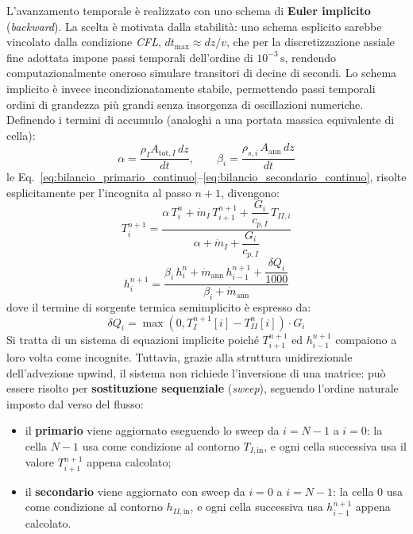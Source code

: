 \documentclass[12pt]{report}
\begin{document}
L'avanzamento temporale è realizzato con uno schema di \textbf{Euler implicito} (\emph{backward}). La scelta è motivata dalla stabilità: uno schema esplicito sarebbe vincolato dalla condizione \textit{CFL}, $dt_{\max}\approx dz/v$, che per la discretizzazione assiale fine adottata impone passi temporali dell'ordine di $10^{-3}\,\si{\second}$, rendendo computazionalmente oneroso simulare transitori di decine di secondi. Lo schema implicito è invece incondizionatamente stabile, permettendo passi temporali ordini di grandezza più grandi senza insorgenza di oscillazioni numeriche.\\
Definendo i termini di accumulo (analoghi a una portata massica equivalente di cella):
\begin{equation}
    \alpha = \frac{\rho_I A_{\text{tot},I}\, dz}{dt}, \qquad
    \beta_i = \frac{\rho_{s,i}\, A_{\text{ann}}\, dz}{dt}
    \label{eq:alpha_beta}
\end{equation}
le Eq.~\eqref{eq:bilancio_primario_continuo}--\eqref{eq:bilancio_secondario_continuo}, risolte esplicitamente per l'incognita al passo $n+1$, divengono:
\begin{equation}
    T_i^{n+1} = \frac{\alpha\, T_i^{n} + \dot m_I\, T_{i+1}^{n+1} + \dfrac{G_i}{c_{p,I}}\, T_{II,i}}
    {\alpha + \dot m_I + \dfrac{G_i}{c_{p,I}}}
    \label{eq:T_implicita}
\end{equation}
\begin{equation}
    h_i^{n+1} = \frac{\beta_i\, h_i^{n} + \dot m_{\text{ann}}\, h_{i-1}^{n+1} + \dfrac{\delta Q_i}{1000}}
    {\beta_i + \dot m_{\text{ann}}}
    \label{eq:h_implicita}
\end{equation}
dove il termine di sorgente termica semimplicito è espresso da:
$$\delta Q_i = \max\left(0, T_I^{n+1}[i] - T_{II}^n[i]\right) \cdot G_i$$
Si tratta di un sistema di equazioni implicite poiché $T_{i+1}^{n+1}$ ed $h_{i-1}^{n+1}$ compaiono a loro volta come incognite. Tuttavia, grazie alla struttura unidirezionale dell'advezione upwind, il sistema non richiede l'inversione di una matrice: può essere risolto per \textbf{sostituzione sequenziale} (\emph{sweep}), seguendo l'ordine naturale imposto dal verso del flusso:
\begin{itemize}
    \item il \textbf{primario} viene aggiornato eseguendo lo sweep da $i=N-1$ a $i=0$: la cella $N-1$ usa come condizione al contorno $T_{I,\text{in}}$, e ogni cella successiva usa il valore $T^{n+1}_{i+1}$ appena calcolato;
    \item il \textbf{secondario} viene aggiornato con sweep da $i=0$ a $i=N-1$: la cella $0$ usa come condizione al contorno $h_{II,\text{in}}$, e ogni cella successiva usa $h^{n+1}_{i-1}$ appena calcolato.
\end{itemize}
\end{document}
